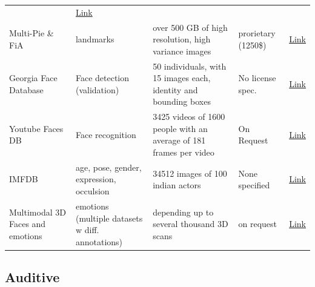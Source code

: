 \begin{longtable}[]{@{}p{}p{}p{}p{}p{}@{}}
&
\href{http://www.robots.ox.ac.uk/~vgg/data/vgg_face2/}{Link}\tabularnewline
Multi-Pie \& FiA & landmarks & over 500 GB of high resolution, high
variance images & prorietary (1250\$) &
\href{https://flintbox.com/public/project/5486/}{Link}\tabularnewline
Georgia Face Database & Face detection (validation) & 50 individuals,
with 15 images each, identity and bounding boxes & No license spec. &
\href{http://www.anefian.com/research/face_reco.htm}{Link}\tabularnewline
Youtube Faces DB & Face recognition & 3425 videos of 1600 people with an
average of 181 frames per video & On Request &
\href{http://www.cs.tau.ac.il/~wolf/ytfaces/}{Link}\tabularnewline
IMFDB & age, pose, gender, expression, occulsion & 34512 images of 100
indian actors & None specified &
\href{http://cvit.iiit.ac.in/projects/IMFDB/}{Link}\tabularnewline
Multimodal 3D Faces and emotions & emotions (multiple datasets w diff.
annotations) & depending up to several thousand 3D scans & on request &
\href{http://www.cs.binghamton.edu/~lijun/Research/3DFE/3DFE_Analysis.html}{Link}\tabularnewline
\bottomrule
\end{longtable}

\hypertarget{auditive}{%
\subsection{Auditive}\label{auditive}}

